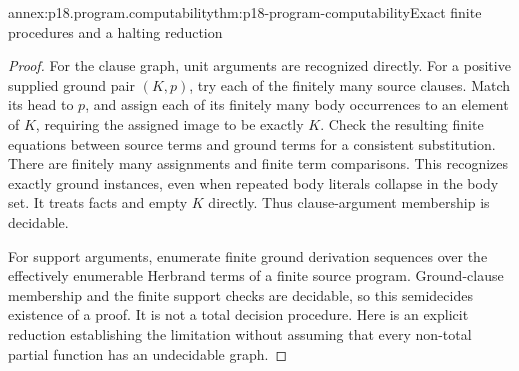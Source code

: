 \begin{annexitem}{annex:p18.program.computability}{thm:p18-program-computability}{Exact finite procedures and a halting reduction}
\begin{proof}
For the clause graph, unit arguments are recognized
directly. For a positive supplied ground pair
\((K,p)\), try each of the finitely many source
clauses. Match its head to \(p\), and assign
each of its finitely many body occurrences to
an element of \(K\), requiring the assigned
image to be exactly \(K\). Check the resulting
finite equations between source terms and
ground terms for a consistent substitution.
There are finitely many assignments and
finite term comparisons. This recognizes
exactly ground instances, even when repeated
body literals collapse in the body set.
It treats facts and empty \(K\) directly.
Thus clause-argument membership is decidable.

For support arguments, enumerate finite ground
derivation sequences over the effectively
enumerable Herbrand terms of a finite source
program. Ground-clause membership and the
finite support checks are decidable, so
this semidecides existence of a proof.
It is not a total decision procedure.
Here is an explicit reduction establishing
the limitation without assuming that every
non-total partial function has an
undecidable graph.


\end{proof}
\end{annexitem}
